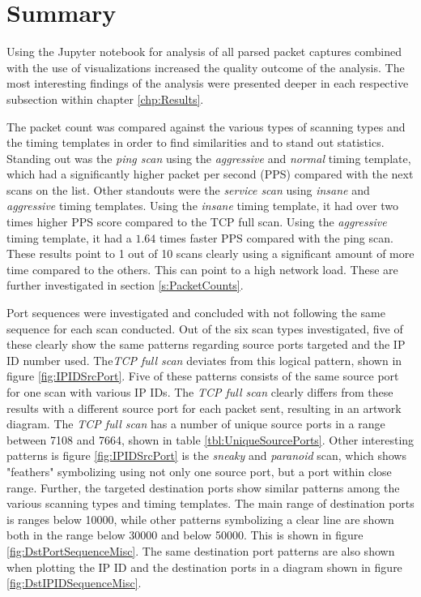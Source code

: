 \section{Summary}
Using the Jupyter notebook for analysis of all parsed packet captures combined with the use of visualizations increased the quality outcome of the analysis.
The most interesting findings of the analysis were presented deeper in each respective subsection within chapter \ref{chp:Results}.

The packet count was compared against the various types of scanning types and the timing templates in order to find similarities and to stand out statistics.
Standing out was the \textit{ping scan} using the \textit{aggressive} and \textit{normal} timing template, which had a significantly higher packet per second (PPS) compared with the next scans on the list. Other standouts were the \textit{service scan} using \textit{insane} and \textit{aggressive} timing templates. Using the \textit{insane} timing template, it had over two times higher PPS score compared to the TCP full scan. Using the \textit{aggressive} timing template, it had a $1.64$ times faster PPS compared with the ping scan.
These results point to 1 out of 10 scans clearly using a significant amount of more time compared to the others. This can point to a high network load.
These are further investigated in section \ref{s:PacketCounts}.

Port sequences were investigated and concluded with not following the same sequence for each scan conducted.
Out of the six scan types investigated, five of these clearly show the same patterns regarding source ports targeted and the IP ID number used. The\textit{TCP full scan} deviates from this logical pattern, shown in figure \ref{fig:IPIDSrcPort}.
Five of these patterns consists of the same source port for one scan with various IP IDs. The \textit{TCP full scan} clearly differs from these results with a different source port for each packet sent, resulting in an artwork diagram. The \textit{TCP full scan} has a number of unique source ports in a range between 7108 and 7664, shown in table \ref{tbl:UniqueSourcePorts}.
Other interesting patterns is figure \ref{fig:IPIDSrcPort} is the \textit{sneaky} and \textit{paranoid} scan, which shows "feathers" symbolizing using not only one source port, but a port within close range.
Further, the targeted destination ports show similar patterns among the various scanning types and timing templates. The main range of destination ports is ranges below 10000, while other patterns symbolizing a clear line are shown both in the range below 30000 and below 50000. This is shown in figure \ref{fig:DstPortSequenceMisc}.
The same destination port patterns are also shown when plotting the IP ID and the destination ports in a diagram shown in figure \ref{fig:DstIPIDSequenceMisc}.

